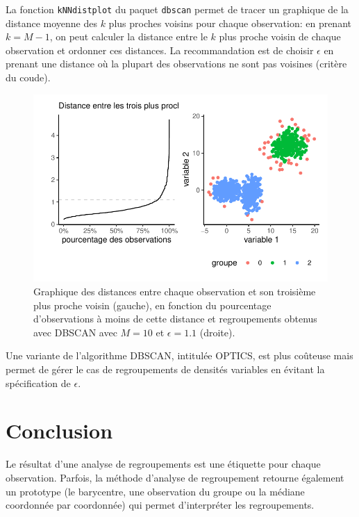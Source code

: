 \documentclass[
  11pt,
  letterpaper,
]{scrbook}
\theoremstyle{definition}
\theoremstyle{remark}
\begin{document}
La fonction \texttt{kNNdistplot} du paquet \texttt{dbscan} permet de
tracer un graphique de la distance moyenne des \(k\) plus proches
voisins pour chaque observation: en prenant \(k=M-1\), on peut calculer
la distance entre le \(k\) plus proche voisin de chaque observation et
ordonner ces distances. La recommandation est de choisir \(\epsilon\) en
prenant une distance où la plupart des observations ne sont pas voisines
(critère du coude).

\begin{figure}[ht!]

{\centering \includegraphics{./03-regroupements_files/figure-pdf/fig-dbscan2-1.pdf}

}

\caption{\label{fig-dbscan2}Graphique des distances entre chaque
observation et son troisième plus proche voisin (gauche), en fonction du
pourcentage d'observations à moins de cette distance et regroupements
obtenus avec DBSCAN avec \(M=10\) et \(\epsilon=1.1\) (droite).}

\end{figure}

Une variante de l'algorithme DBSCAN, intitulée OPTICS, est plus coûteuse
mais permet de gérer le cas de regroupements de densités variables en
évitant la spécification de \(\epsilon\).

\hypertarget{conclusion}{%
\section{Conclusion}\label{conclusion}}

Le résultat d'une analyse de regroupements est une étiquette pour chaque
observation. Parfois, la méthode d'analyse de regroupement retourne
également un prototype (le barycentre, une observation du groupe ou la
médiane coordonnée par coordonnée) qui permet d'interpréter les
regroupements.
\end{document}
